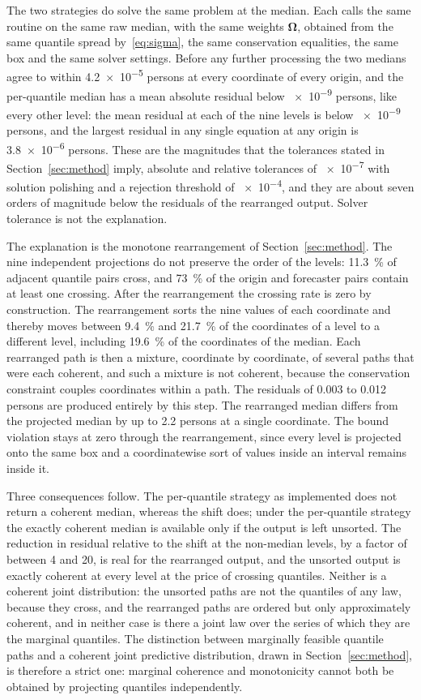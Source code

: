 \documentclass[utf8]{FrontiersinHarvard}
\newif\ifsecondrevisionmarkup
\newcommand{\rev}[1]{\ifsecondrevisionmarkup\textcolor{revisiontwo}{#1}\else#1\fi}
\theoremstyle{plain}
\theoremstyle{definition}
\theoremstyle{remark}
\newcommand{\bOm}{\bm{\Omega}}
\begin{document}
\rev{The two strategies do solve the same problem at the median. Each calls the same routine on the same raw median, with the same weights $\bOm$, obtained from the same quantile spread by~\eqref{eq:sigma}, the same conservation equalities, the same box and the same solver settings. Before any further processing the two medians agree to within \num{4.2e-5} persons at every coordinate of every origin, and the per-quantile median has a mean absolute residual below \num{e-9} persons, like every other level: the mean residual at each of the nine levels is below \num{e-9} persons, and the largest residual in any single equation at any origin is \num{3.8e-6} persons. These are the magnitudes that the tolerances stated in Section~\ref{sec:method} imply, absolute and relative tolerances of \num{e-7} with solution polishing and a rejection threshold of \num{e-4}, and they are about seven orders of magnitude below the residuals of the rearranged output. Solver tolerance is not the explanation.}

\rev{The explanation is the monotone rearrangement of Section~\ref{sec:method}. The nine independent projections do not preserve the order of the levels: \SI{11.3}{\percent} of adjacent quantile pairs cross, and \SI{73}{\percent} of the origin and forecaster pairs contain at least one crossing. After the rearrangement the crossing rate is zero by construction. The rearrangement sorts the nine values of each coordinate and thereby moves between \SI{9.4}{\percent} and \SI{21.7}{\percent} of the coordinates of a level to a different level, including \SI{19.6}{\percent} of the coordinates of the median. Each rearranged path is then a mixture, coordinate by coordinate, of several paths that were each coherent, and such a mixture is not coherent, because the conservation constraint couples coordinates within a path. The residuals of \num{0.003} to \num{0.012} persons are produced entirely by this step. The rearranged median differs from the projected median by up to \num{2.2} persons at a single coordinate. The bound violation stays at zero through the rearrangement, since every level is projected onto the same box and a coordinatewise sort of values inside an interval remains inside it.}

\rev{Three consequences follow. The per-quantile strategy as implemented does not return a coherent median, whereas the shift does; under the per-quantile strategy the exactly coherent median is available only if the output is left unsorted. The reduction in residual relative to the shift at the non-median levels, by a factor of between \num{4} and \num{20}, is real for the rearranged output, and the unsorted output is exactly coherent at every level at the price of crossing quantiles. Neither is a coherent joint distribution: the unsorted paths are not the quantiles of any law, because they cross, and the rearranged paths are ordered but only approximately coherent, and in neither case is there a joint law over the series of which they are the marginal quantiles. The distinction between marginally feasible quantile paths and a coherent joint predictive distribution, drawn in Section~\ref{sec:method}, is therefore a strict one: marginal coherence and monotonicity cannot both be obtained by projecting quantiles independently.}
\end{document}
